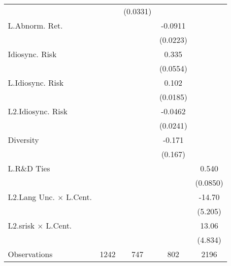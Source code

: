 {\begin{tabular}{l*{4}{c}}
                    &                     &    (0.0331)         &                     &                     \\
L.Abnorm. Ret.      &                     &                     &     -0.0911\sym{***}&                     \\
                    &                     &                     &    (0.0223)         &                     \\
Idiosync. Risk      &                     &                     &       0.335\sym{***}&                     \\
                    &                     &                     &    (0.0554)         &                     \\
L.Idiosync. Risk    &                     &                     &       0.102\sym{***}&                     \\
                    &                     &                     &    (0.0185)         &                     \\
L2.Idiosync. Risk   &                     &                     &     -0.0462\sym{+}  &                     \\
                    &                     &                     &    (0.0241)         &                     \\
Diversity           &                     &                     &      -0.171         &                     \\
                    &                     &                     &     (0.167)         &                     \\
L.R\&D Ties         &                     &                     &                     &       0.540\sym{***}\\
                    &                     &                     &                     &    (0.0850)         \\
L2.Lang Unc. $\times$ L.Cent.&                     &                     &                     &      -14.70\sym{**} \\
                    &                     &                     &                     &     (5.205)         \\
L2.srisk $\times$ L.Cent.&                     &                     &                     &       13.06\sym{**} \\
                    &                     &                     &                     &     (4.834)         \\
\hline
Observations        &        1242         &         747         &         802         &        2196         \\

\end{tabular}}
